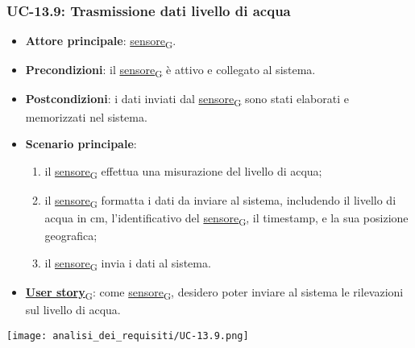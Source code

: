 \subsubsection{UC-13.9: Trasmissione dati livello di acqua}
\begin{itemize}
	\item \textbf{Attore principale}: \href{https://7last.github.io/docs/pb/documentazione-interna/glossario\#sensore}{sensore\textsubscript{G}}.
	\item \textbf{Precondizioni}: il \href{https://7last.github.io/docs/pb/documentazione-interna/glossario\#sensore}{sensore\textsubscript{G}} è attivo e collegato al sistema.
	\item \textbf{Postcondizioni}: i dati inviati dal \href{https://7last.github.io/docs/pb/documentazione-interna/glossario\#sensore}{sensore\textsubscript{G}} sono stati elaborati e memorizzati nel sistema.
	\item \textbf{Scenario principale}:
	      \begin{enumerate}
		      \item il \href{https://7last.github.io/docs/pb/documentazione-interna/glossario\#sensore}{sensore\textsubscript{G}} effettua una misurazione del livello di acqua;
		      \item il \href{https://7last.github.io/docs/pb/documentazione-interna/glossario\#sensore}{sensore\textsubscript{G}} formatta i dati da inviare al sistema, includendo il livello di acqua in cm, l'identificativo del \href{https://7last.github.io/docs/pb/documentazione-interna/glossario\#sensore}{sensore\textsubscript{G}},
		            il timestamp, e la sua posizione geografica;
		      \item il \href{https://7last.github.io/docs/pb/documentazione-interna/glossario\#sensore}{sensore\textsubscript{G}} invia i dati al sistema.
	      \end{enumerate}
	\item \href{https://7last.github.io/docs/pb/documentazione-interna/glossario\#user-story}{\textbf{User story}\textsubscript{G}}: come \href{https://7last.github.io/docs/pb/documentazione-interna/glossario\#sensore}{sensore\textsubscript{G}}, desidero poter inviare al sistema le rilevazioni sul livello di acqua.
\end{itemize}

\begin{center}
	\texttt{[image: analisi\_dei\_requisiti/UC-13.9.png]}
\end{center}

